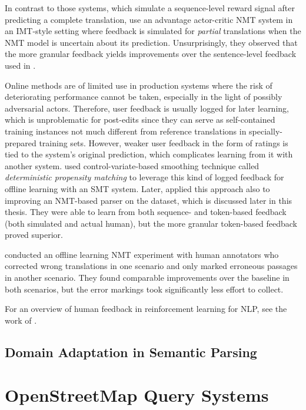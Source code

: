 In contrast to those systems, which simulate a sequence-level reward signal
after predicting a complete translation, \textcite{lam-2018} use an advantage
actor-critic NMT system in an IMT-style setting where feedback is simulated for
\emph{partial} translations when the NMT model is uncertain about its
prediction. Unsurprisingly, they observed that the more granular feedback yields
improvements over the sentence-level feedback used in \textcite{nguyen-2017}.

Online methods are of limited use in production systems where the risk of
deteriorating performance cannot be taken, especially in the light of possibly
adversarial actors. Therefore, user feedback is usually logged for later
learning, which is unproblematic for post-edits since they can serve as
self-contained training instances not much different from reference translations
in specially-prepared training sets. However, weaker user feedback in the form
of ratings is tied to the system’s original prediction, which complicates
learning from it with another system. \textcite{lawrence-2017} used
control-variate-based smoothing technique called \emph{deterministic propensity
  matching} to leverage this kind of logged feedback for offline learning with
an SMT system. Later, \textcite{lawrence-2018} applied this approach also to
improving an NMT-based parser on the \nlmapstwo{} dataset, which is discussed
later in this thesis. They were able to learn from both sequence- and
token-based feedback (both simulated and actual human), but the more granular
token-based feedback proved superior.

\textcite{kreutzer-2020a} conducted an offline learning NMT experiment with
human annotators who corrected wrong translations in one scenario and only
marked erroneous passages in another scenario. They found comparable
improvements over the baseline in both scenarios, but the error markings took
significantly less effort to collect.

For an overview of human feedback in reinforcement learning for NLP, see the
work of \textcite{kreutzer-2020b}.

\subsection{Domain Adaptation in Semantic Parsing}

\section{OpenStreetMap Query Systems}

